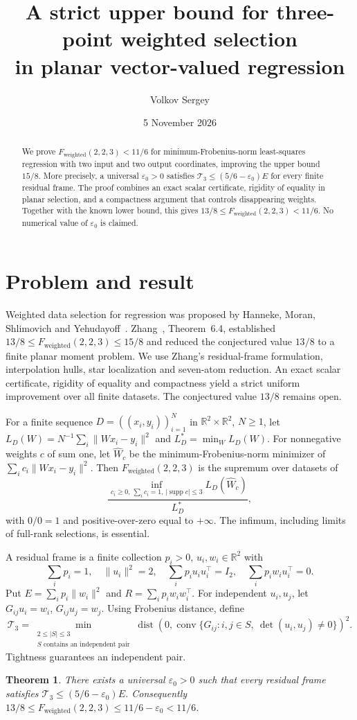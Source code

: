 \documentclass[10pt]{article}
\title{A strict upper bound for three-point weighted selection\\in planar vector-valued regression}
\author{Volkov Sergey}
\date{5 November 2026}
\newtheorem{theorem}{Theorem}
\newcommand{\R}{\mathbb R}
\newcommand{\conv}{\operatorname{conv}}
\newcommand{\supp}{\operatorname{supp}}
\newcommand{\Fw}{F_{\mathrm{weighted}}(2,2,3)}
\newcommand{\T}{\mathcal T_3}
\begin{document}
\maketitle
\begin{abstract}
We prove $F_{\mathrm{weighted}}(2,2,3)<11/6$ for minimum-Frobenius-norm
least-squares regression with two input and two output coordinates,
improving the upper bound $15/8$. More precisely, a universal
$\varepsilon_0>0$ satisfies
$\mathcal T_3\le(5/6-\varepsilon_0)E$ for every finite residual frame.
The proof combines an exact scalar certificate, rigidity of equality in
planar selection, and a compactness argument that controls disappearing
weights. Together with the known lower bound, this gives
$13/8\le F_{\mathrm{weighted}}(2,2,3)<11/6$.
No numerical value of $\varepsilon_0$ is claimed.
\end{abstract}

\section{Problem and result}
Weighted data selection for regression was proposed by
Hanneke, Moran, Shlimovich and Yehudayoff~\cite{open,erms}.
Zhang~\cite{zhang}, Theorem~6.4, established
$13/8\le\Fw\le15/8$ and reduced the conjectured value $13/8$
to a finite planar moment problem. We use Zhang's residual-frame formulation,
interpolation hulls, star localization and seven-atom reduction.
An exact scalar certificate, rigidity of equality and compactness yield
a strict uniform improvement over all finite datasets.
The conjectured value $13/8$ remains open.

For a finite sequence $D=((x_i,y_i))_{i=1}^N$ in $\R^2\times\R^2$, $N\ge1$, let
$L_D(W)=N^{-1}\sum_i\|Wx_i-y_i\|^2$ and $L_D^*=\min_W L_D(W)$.
For nonnegative weights $c$ of sum one, let $\widehat W_c$ be the
minimum-Frobenius-norm minimizer of $\sum_i c_i\|Wx_i-y_i\|^2$.
Then $\Fw$ is the supremum over datasets of
\[
 \frac{\inf_{c_i\ge0,\,\sum_i c_i=1,\,|\supp c|\le3}L_D(\widehat W_c)}{L_D^*},
\]
with $0/0=1$ and positive-over-zero equal to $+\infty$.
The infimum, including limits of full-rank selections,
is essential.

A residual frame is a finite collection $p_i>0$, $u_i,w_i\in\R^2$ with
\begin{equation}\label{frame}
 \sum_i p_i=1,\quad\|u_i\|^2=2,\quad
 \sum_i p_i u_i u_i^\top=I_2,\quad\sum_i p_i w_i u_i^\top=0.
\end{equation}
Put $E=\sum_i p_i\|w_i\|^2$ and $R=\sum_i p_iw_iw_i^\top$.
For independent $u_i,u_j$, let $G_{ij}u_i=w_i$, $G_{ij}u_j=w_j$.
Using Frobenius distance, define
\[
 \T=\min_{\substack{2\le|S|\le3\\S\text{ contains an independent pair}}}
 \operatorname{dist}\left(0,
 \conv\{G_{ij}:i,j\in S,\ \det(u_i,u_j)\ne0\}\right)^2.
\]
Tightness guarantees an independent pair.
\begin{theorem}\label{main}
There exists a universal $\varepsilon_0>0$ such that every residual frame
satisfies $\T\le(5/6-\varepsilon_0)E$. Consequently
$13/8\le\Fw\le11/6-\varepsilon_0<11/6$.
\end{theorem}
\end{document}
